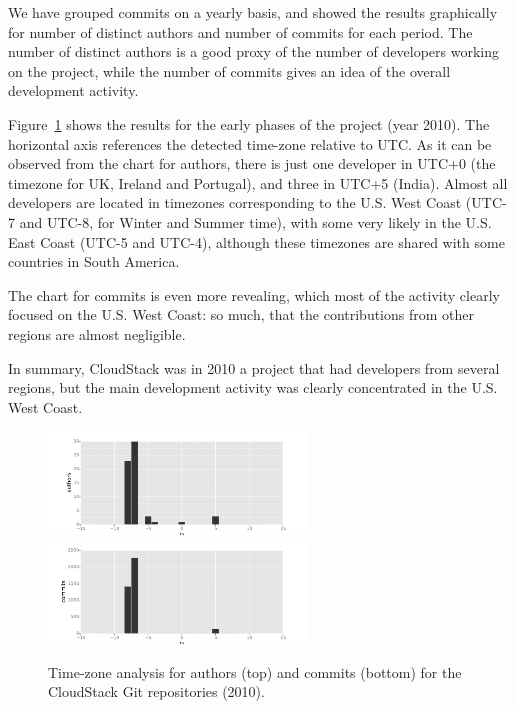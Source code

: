 \documentclass{sig-alternate-05-2015}
\begin{document}

We have grouped commits on a yearly basis, and showed the results graphically for number of distinct authors and number of commits for each period. The number of distinct authors is a good proxy of the number of developers working on the project, while the number of commits gives an idea of the overall development activity.

Figure~\ref{fig:2010-scm} shows the results for the early phases of the
project (year 2010). The horizontal axis references the detected time-zone
relative to UTC. As it can be observed from the chart for authors, there is just one developer in UTC+0 (the timezone for UK, Ireland and Portugal), and three in UTC+5 (India). Almost all developers are located in timezones corresponding to the U.S. West Coast (UTC-7 and UTC-8, for Winter and Summer time), with some very likely in the U.S. East Coast (UTC-5 and UTC-4), although these timezones are shared with some countries in South America.

The chart for commits is even more revealing, which most of the activity clearly focused on the U.S. West Coast: so much, that the contributions from other regions are almost negligible.

In summary, CloudStack was in 2010 a project that had developers from several regions, but the main development activity was clearly concentrated in the U.S. West Coast.

\begin{figure}[!h]
\centering
\includegraphics[width=6.9cm]{figs/cloudstack/tz-scm-authors-2010.pdf}
\includegraphics[width=6.9cm]{figs/cloudstack/tz-scm-commits-2010.pdf}
\caption{Time-zone analysis for authors (top) and commits (bottom) for
the CloudStack Git repositories (2010).}
\label{fig:2010-scm}
\end{figure}
\end{document}
